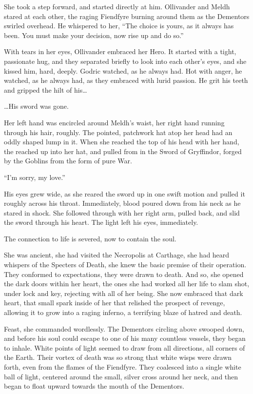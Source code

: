 She took a step forward, and started directly at him. Ollivander and Meldh stared at each other, the raging Fiendfyre burning around them as the Dementors swirled overhead. He whispered to her, “The choice is yours, as it always has been. You must make your decision, now rise up and do so.”

With tears in her eyes, Ollivander embraced her Hero. It started with a tight, passionate hug, and they separated briefly to look into each other’s eyes, and she kissed him, hard, deeply. Godric watched, as he always had. Hot with anger, he watched, as he always had, as they embraced with lurid passion. He grit his teeth and gripped the hilt of his…

…His sword was gone.

Her left hand was encircled around Meldh’s waist, her right hand running through his hair, roughly. The pointed, patchwork hat atop her head had an oddly shaped lump in it. When she reached the top of his head with her hand, the reached up into her hat, and pulled from in the Sword of Gryffindor, forged by the Goblins from the form of pure War.

“I’m sorry, my love.”

His eyes grew wide, as she reared the sword up in one swift motion and pulled it roughly across his throat. Immediately, blood poured down from his neck as he stared in shock. She followed through with her right arm, pulled back, and slid the sword through his heart. The light left his eyes, immediately.

The connection to life is severed, now to contain the soul.

She was ancient, she had visited the Necropolis at Carthage, she had heard whispers of the Specters of Death, she knew the basic premise of their operation. They conformed to expectations, they were drawn to death. And so, she opened the dark doors within her heart, the ones she had worked all her life to slam shot, under lock and key, rejecting with all of her being. She now embraced that dark heart, that small spark inside of her that relished the prospect of revenge, allowing it to grow into a raging inferno, a terrifying blaze of hatred and death.

Feast, she commanded wordlessly. The Dementors circling above swooped down, and before his soul could escape to one of his many countless vessels, they began to inhale. White points of light seemed to draw from all directions, all corners of the Earth. Their vortex of death was so strong that white wisps were drawn forth, even from the flames of the Fiendfyre. They coalesced into a single white ball of light, centered around the small, silver cross around her neck, and then began to float upward towards the mouth of the Dementors.

